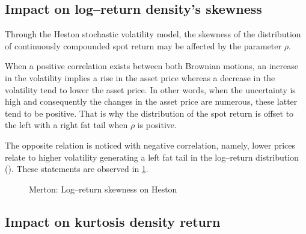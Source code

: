 \documentclass[12pt]{report}
\begin{document}
\subsection{Impact on log--return density's skewness}
\label{sub:hestonskewness}

Through the Heston stochastic volatility model, the skewness of the distribution of continuously compounded spot return may be affected by the parameter $\rho$. 

When a positive correlation exists between both Brownian motions, an increase in the volatility implies a rise in the asset price whereas a decrease in the volatility tend to lower the asset price.
In other words, when the uncertainty is high and consequently the changes in the asset price are numerous, these latter tend to be positive. 
That is why the distribution of the spot return is offset to the left with a right fat tail when $\rho$ is positive.

The opposite relation is noticed with negative correlation, namely, lower prices relate to higher volatility generating a left fat tail in the log–return distribution (\citet{heston1993}).
These statements are observed in \cref{p:other:heston:skewness}.



\begin{figure}[H]
\centering

\caption{Merton: Log--return skewness on Heston}
\label{p:other:heston:skewness}
\end{figure}

\subsection{Impact on kurtosis density return}
\label{sub:hestonkurtosis}
\end{document}
